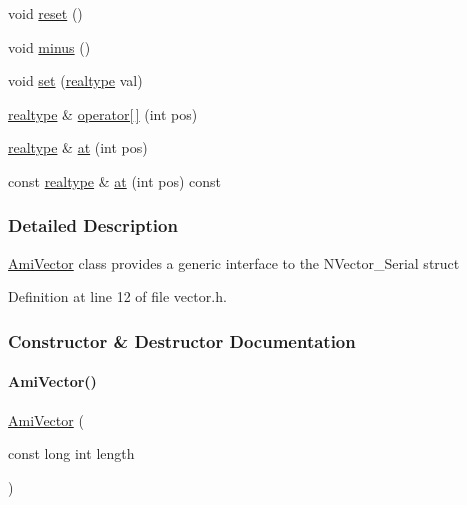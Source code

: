 \begin{DoxyCompactItemize}
\item 
void \mbox{\hyperlink{classamici_1_1_ami_vector_ad20897c5c8bd47f5d4005989bead0e55}{reset}} ()
\item 
void \mbox{\hyperlink{classamici_1_1_ami_vector_a19ad39a609bfc430ed6f7992e841b024}{minus}} ()
\item 
void \mbox{\hyperlink{classamici_1_1_ami_vector_a11418c829db7c2891d63491cf12d29b4}{set}} (\mbox{\hyperlink{namespaceamici_a1bdce28051d6a53868f7ccbf5f2c14a3}{realtype}} val)
\item 
\mbox{\hyperlink{namespaceamici_a1bdce28051d6a53868f7ccbf5f2c14a3}{realtype}} \& \mbox{\hyperlink{classamici_1_1_ami_vector_a3cea12a1bf8945da7c2d39b9ee526ed2}{operator\mbox{[}$\,$\mbox{]}}} (int pos)
\item 
\mbox{\hyperlink{namespaceamici_a1bdce28051d6a53868f7ccbf5f2c14a3}{realtype}} \& \mbox{\hyperlink{classamici_1_1_ami_vector_ae62cf934983479ccb255785bdf455a2c}{at}} (int pos)
\item 
const \mbox{\hyperlink{namespaceamici_a1bdce28051d6a53868f7ccbf5f2c14a3}{realtype}} \& \mbox{\hyperlink{classamici_1_1_ami_vector_aa15689120d419cd3d858bc62bc024cb9}{at}} (int pos) const
\end{DoxyCompactItemize}


\subsubsection{Detailed Description}
\mbox{\hyperlink{classamici_1_1_ami_vector}{Ami\+Vector}} class provides a generic interface to the N\+Vector\+\_\+\+Serial struct 

Definition at line 12 of file vector.\+h.



\subsubsection{Constructor \& Destructor Documentation}
\mbox{\label{classamici_1_1_ami_vector_a843c8e8dfc2642218e9f42d86d42c28c}} 
\paragraph{\texorpdfstring{AmiVector()}{AmiVector()}\hspace{0.1cm}{\footnotesize\ttfamily [1/3]}}
{\footnotesize\ttfamily \mbox{\hyperlink{classamici_1_1_ami_vector}{Ami\+Vector}} (\begin{DoxyParamCaption}\item[{const long int}]{length }\end{DoxyParamCaption})\hspace{0.3cm}{\ttfamily [explicit]}}

